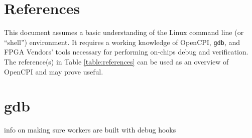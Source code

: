\newpage

\tableofcontents

\newpage

\section{References}

	This document assumes a basic understanding of the Linux command line (or ``shell'') environment. It requires a working knowledge of OpenCPI, \texttt{gdb}, and FPGA Vendors' tools necessary for performing on-chips debug and verification. The reference(s) in Table \ref{table:references} can be used as an overview of OpenCPI and may prove useful.
\def\myreferences{
\hline
ChipScope Pro\footnote{Full title: ``ChipScope Pro Software and Cores (UG029)''} & Xilinx &
\url{http://www.xilinx.com/support/documentation/sw_manuals/xilinx14_7/chipscope_pro_sw_cores_ug029.pdf}
\\
}

\newpage
\section{gdb}
info on making sure workers are built with debug hooks
